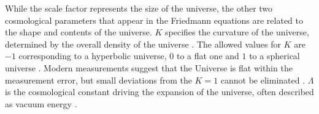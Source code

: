 \documentclass[english, oneside]{HYgradu}
\begin{document}
While the scale factor represents the size of the universe, the other two cosmological parameters that appear in the Friedmann equations are related to the shape and contents of the universe. $K$ specifies the curvature of the universe, determined by the overall density of the universe \citep{mo2010galaxy}. The allowed values for $K$ are $-1$ corresponding to a hyperbolic universe, $0$ to a flat one and $1$ to a spherical universe \citep{mo2010galaxy}. Modern measurements suggest that the Universe is flat within the measurement error, but small deviations from the $K=1$ cannot be eliminated \citep{planck2016resultsI}. $\Lambda$ is the cosmological constant driving the expansion of the universe, often described as vacuum energy \citep{mo2010galaxy}.







\end{document}
